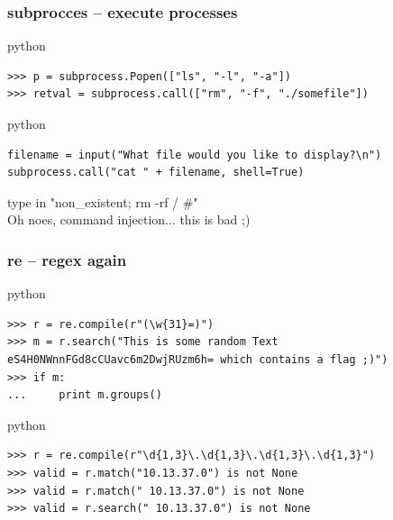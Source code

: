 \documentclass{beamer}
\begin{document}
\begin{frame}[fragile]
	\frametitle{subprocces -- execute processes}
	\begin{exampleblock}{python}
	\begin{lstlisting}
>>> p = subprocess.Popen(["ls", "-l", "-a"])
>>> retval = subprocess.call(["rm", "-f", "./somefile"])
	\end{lstlisting}
	\end{exampleblock}
\pause
	\begin{exampleblock}{python}
	\begin{lstlisting}
filename = input("What file would you like to display?\n")
subprocess.call("cat " + filename, shell=True)
	\end{lstlisting}
	\end{exampleblock}
\pause
	type in "non\_existent; rm -rf / \#"\\
	Oh noes, command injection... this is bad ;)
\end{frame}

\begin{frame}[fragile]
	\frametitle{re -- regex again}
	\begin{exampleblock}{python}
	\begin{lstlisting}
>>> r = re.compile(r"(\w{31}=)")
>>> m = r.search("This is some random Text eS4H0NWnnFGd8cCUavc6m2DwjRUzm6h= which contains a flag ;)")
>>> if m:
...     print m.groups()
	\end{lstlisting}
	\end{exampleblock}
\pause
	\begin{exampleblock}{python}
	\begin{lstlisting}
>>> r = re.compile(r"\d{1,3}\.\d{1,3}\.\d{1,3}\.\d{1,3}")
>>> valid = r.match("10.13.37.0") is not None
>>> valid = r.match(" 10.13.37.0") is not None
>>> valid = r.search(" 10.13.37.0") is not None
	\end{lstlisting}
	\end{exampleblock}
\end{frame}
\end{document}
